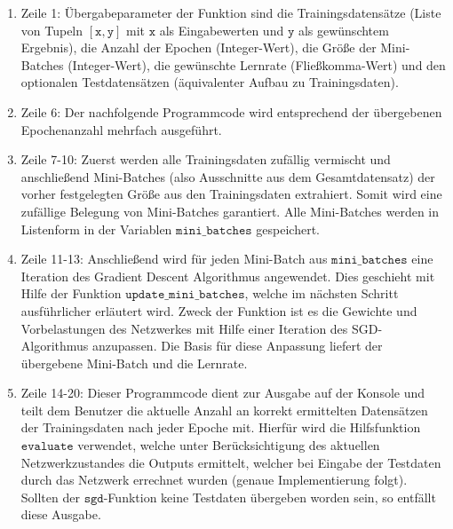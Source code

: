 \begin{enumerate}
\item Zeile 1: Übergabeparameter der Funktion sind die Trainingsdatensätze (Liste von Tupeln $\mathtt{[x,y]}$ mit $\mathtt{x}$ als Eingabewerten und $\mathtt{y}$ als gewünschtem Ergebnis), die Anzahl der Epochen (Integer-Wert), die Größe der Mini-Batches (Integer-Wert), die gewünschte Lernrate (Fließkomma-Wert) und den optionalen Testdatensätzen (äquivalenter Aufbau zu Trainingsdaten).
\item Zeile 6: Der nachfolgende Programmcode wird entsprechend der übergebenen Epochenanzahl mehrfach ausgeführt.
\item Zeile 7-10: Zuerst werden alle Trainingsdaten zufällig vermischt und anschließend Mini-Batches (also Ausschnitte aus dem Gesamtdatensatz) der vorher festgelegten Größe aus den Trainingsdaten extrahiert. Somit wird eine zufällige Belegung von Mini-Batches garantiert. Alle Mini-Batches werden in Listenform in der Variablen $\mathtt{mini\_batches}$ gespeichert.
\item Zeile 11-13: Anschließend wird für jeden Mini-Batch aus $\mathtt{mini\_batches}$ eine Iteration des Gradient Descent Algorithmus angewendet. Dies geschieht mit Hilfe der Funktion $\mathtt{update\_mini\_batches}$, welche im nächsten Schritt ausführlicher erläutert wird. Zweck der Funktion ist es die Gewichte und Vorbelastungen des Netzwerkes mit Hilfe einer Iteration des SGD-Algorithmus anzupassen. Die Basis für diese Anpassung liefert der übergebene Mini-Batch und die Lernrate.
\item Zeile 14-20: Dieser Programmcode dient zur Ausgabe auf der Konsole und teilt dem Benutzer die aktuelle Anzahl an korrekt ermittelten Datensätzen der Trainingsdaten nach jeder Epoche mit. Hierfür wird die Hilfsfunktion $\mathtt{evaluate}$ verwendet, welche unter Berücksichtigung des aktuellen Netzwerkzustandes die Outputs ermittelt, welcher bei Eingabe der Testdaten durch das Netzwerk errechnet wurden (genaue Implementierung folgt). Sollten der $\mathtt{sgd}$-Funktion keine Testdaten übergeben worden sein, so entfällt diese Ausgabe.
\end{enumerate}

